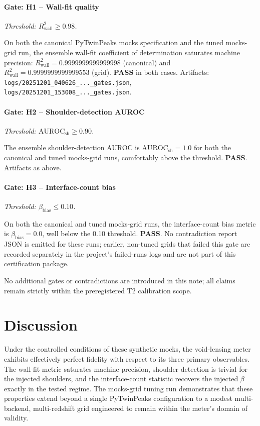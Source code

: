 \documentclass{article}
\newenvironment{vdmgate}[2]{%
  \paragraph{Gate: #1} \emph{Threshold: #2.}%
  \par\noindent}{\medskip}
\begin{document}
\begin{vdmgate}{H1 -- Wall-fit quality}{$R^2_{\text{wall}} \ge 0.98$}
On both the canonical PyTwinPeaks mocks specification and the tuned
mocks-grid run, the ensemble wall-fit coefficient of determination
saturates machine precision:
$R^2_{\text{wall}} = 0.9999999999999998$ (canonical) and
$R^2_{\text{wall}} = 0.9999999999999553$ (grid).
\textbf{PASS} in both cases.
Artifacts:
\texttt{logs/20251201\_040626\_...\_gates.json},
\texttt{logs/20251201\_153008\_...\_gates.json}.
\end{vdmgate}

\begin{vdmgate}{H2 -- Shoulder-detection AUROC}{$\mathrm{AUROC}_{\text{sh}} \ge 0.90$}
The ensemble shoulder-detection AUROC is $\mathrm{AUROC}_{\text{sh}} = 1.0$
for both the canonical and tuned mocks-grid runs, comfortably above the
threshold.
\textbf{PASS}.
Artifacts as above.
\end{vdmgate}

\begin{vdmgate}{H3 -- Interface-count bias}{$\beta_{\text{bias}} \le 0.10$}
On both the canonical and tuned mocks-grid runs, the interface-count
bias metric is $\beta_{\text{bias}} = 0.0$, well below the 0.10
threshold.
\textbf{PASS}.
No contradiction report JSON is emitted for these runs; earlier,
non-tuned grids that failed this gate are recorded separately in the
project's failed-runs logs and are not part of this certification package.
\end{vdmgate}

No additional gates or contradictions are introduced in this note; all
claims remain strictly within the preregistered T2 calibration scope.

\section{Discussion}
Under the controlled conditions of these synthetic mocks, the
void-lensing meter exhibits effectively perfect fidelity with respect
to its three primary observables.
The wall-fit metric saturates machine precision, shoulder detection
is trivial for the injected shoulders, and the interface-count
statistic recovers the injected $\beta$ exactly in the tested regime.
The mocks-grid tuning run demonstrates that these properties extend
beyond a single PyTwinPeaks configuration to a modest
multi-backend, multi-redshift grid engineered to remain within the
meter's domain of validity.
\end{document}
